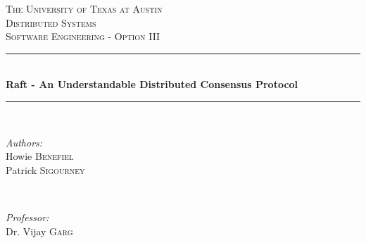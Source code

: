 \begin{titlepage}

\newcommand{\HRule}{\rule{\linewidth}{0.5mm}} %

\center %
 

\textsc{\LARGE The University of Texas at Austin}\\[1.5cm] %
\textsc{\Large Distributed Systems}\\[0.5cm] %
\textsc{\large Software Engineering - Option III}\\[0.5cm] %


\HRule \\[0.4cm]
{ \huge \bfseries Raft - An Understandable Distributed Consensus Protocol}\\[0.4cm] %
\HRule \\[1.5cm]
 

\begin{minipage}{0.4\textwidth}
\begin{flushleft} \large
\emph{Authors:}\\
Howie \textsc{Benefiel}\\
Patrick \textsc{Sigourney} %
\end{flushleft}
\end{minipage}
~
\begin{minipage}{0.4\textwidth}
\begin{flushright} \large
\emph{Professor:} \\
Dr. Vijay \textsc{Garg} %
\end{flushright}
\end{minipage}\\[2cm]


\end{titlepage}
